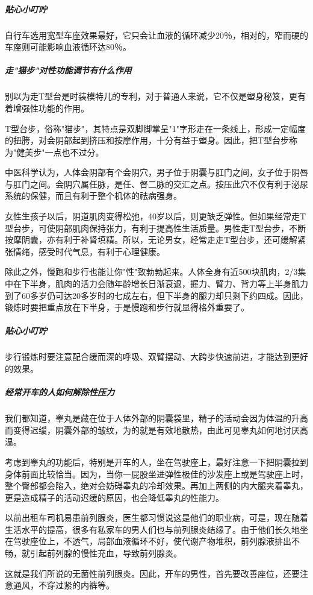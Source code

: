 \subparagraph{贴心小叮咛}

自行车选用宽型车座效果最好，它只会让血液的循环减少20％，相对的，窄而硬的车座则可能影响血液循环达80％。

\subparagraph{走"猫步"对性功能调节有什么作用}

别以为走T型台是时装模特儿的专利，对于普通人来说，它不仅是塑身秘笈，更有着增强性功能的作用。

T型台步，俗称"猫步"，其特点是双脚脚掌呈"1"字形走在一条线上，形成一定幅度的扭胯，对会阴部起到挤压和按摩作用，十分有益于塑身。因此，把T型台步称为"健美步"一点也不过分。

中医科学认为，人体会阴部有个会阴穴，男子位于阴囊与肛门之间，女子位于阴唇与肛门之间。会阴穴属任脉，是任、督二脉的交汇之点。按压此穴不仅有利于泌尿系统的保健，而且有利于整个机体的祛病强身。

女性生孩子以后，阴道肌肉变得松弛，40岁以后，则更缺乏弹性。但如果经常走T型台步，可使阴部肌肉保持张力，有利于提高性生活质量。男性走T型台步，不断按摩阴囊，亦有利于补肾填精。所以，无论男女，经常走走T型台步，还可缓解紧张情绪，感受时代气息，有利于心理健康。

除此之外，慢跑和步行也能让你"性"致勃勃起来。人体全身有近500块肌肉，2/3集中在下半身，肌肉的活力会随年龄增长日渐衰退，握力、臂力、背力等上半身肌力到了60多岁仍可达20多岁时的七成左右，但下半身的腿力却只剩下约四成。因此，锻炼时要把重点放在下半身，于是慢跑和步行就显得格外重要了。

\subparagraph{贴心小叮咛}

步行锻炼时要注意配合缓而深的呼吸、双臂摆动、大跨步快速前进，才能达到更好的效果。

\subparagraph{经常开车的人如何解除性压力}

我们都知道，睾丸是藏在位于人体外部的阴囊袋里，精子的活动会因为体温的升高而变得迟缓，阴囊外部的皱纹，为的就是有效地散热，由此可见睾丸如何地讨厌高温。

考虑到睾丸的功能后，特别是开车的人，坐在驾驶座上，最好注意一下把阴囊拉到身体前面比较恰当。因为，当你一屁股坐进弹性极佳的沙发座上或是驾驶座上时，整个臀部都会陷入，绝对会妨碍睾丸的冷却效果。再加上两侧的内大腿夹着睾丸，更是造成精子的活动迟缓的原因，也会降低睾丸的性能力。

以前出租车司机易患前列腺炎，医生都习惯说这是他们的职业病，可是，现在随着生活水平的提高，很多有私家车的男人们也与前列腺炎结缘了。由于他们长久地坐在驾驶座位上，不透气，局部血液循环不好，使代谢产物堆积，前列腺液排出不畅，就引起前列腺的慢性充血，导致前列腺炎。

这就是我们所说的无菌性前列腺炎。因此，开车的男性，首先要改善座位，还要注意通风，不穿过紧的内裤等。

